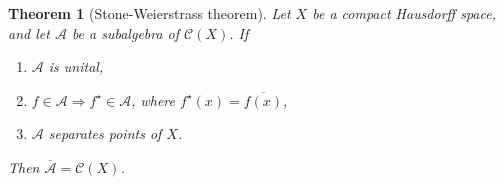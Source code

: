 \documentclass[justified]{tufte-book}
\theoremstyle{plain}%
\newtheorem{thm}{Theorem}[chapter]
\theoremstyle{definition}
\theoremstyle{remark}
\begin{document}
% 
\begin{thm}[Stone-Weierstrass theorem]
  Let $X$ be a compact Hausdorff space, and let $\mathcal{A}$ be a subalgebra of $\mathcal{C}(X)$. If 
  \begin{enumerate}[(1)]
      \item $\mathcal{A}$ is unital,
      \item $f \in \mathcal{A} \Rightarrow f^\star \in \mathcal{A}$, where $f^\star(x) = \overline{f(x)}$,
      \item $\mathcal{A}$ separates points of $X$.
  \end{enumerate}
  Then $\overline{\mathcal{A}} = \mathcal{C}(X)$. 
\end{thm}
\end{document}
